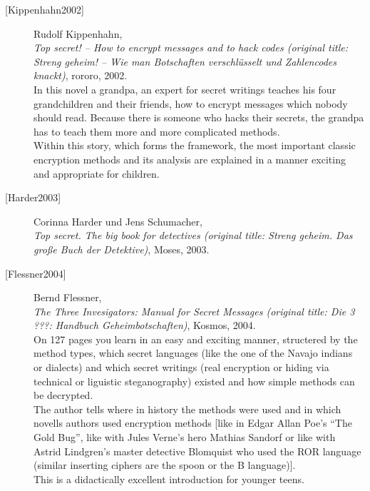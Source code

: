 \begin{description}
\item[\textrm{[Kippenhahn2002]}] 
    Rudolf Kippenhahn, \\
    {\em Top secret! -- How to encrypt messages and to hack codes (original
    title: Streng geheim! -- Wie man Botschaften verschl\"usselt und 
    Zahlencodes knackt)}, rororo, 2002. \\
    In this novel a grandpa, an expert for secret writings teaches his
    four grandchildren and their friends, how to encrypt messages which
    nobody should read. Because there is someone who hacks their secrets,
    the grandpa has to teach them more and more complicated methods. \\
    Within this story, which forms the framework, the most important classic
    encryption methods and its analysis are explained in a manner exciting
    and appropriate for children.\\


\item[\textrm{[Harder2003]}] 
    Corinna Harder und Jens Schumacher, \\
    {\em Top secret. The big book for detectives (original title: 
     Streng geheim. Das gro\ss e Buch der Detektive)}, Moses, 2003. \\


\item[\textrm{[Flessner2004]}] 
    Bernd Flessner, \\
    {\em The Three Invesigators: Manual for Secret Messages (original
    title: Die 3 ???: Handbuch Geheimbotschaften)},
    Kosmos, 2004. \\
    On 127 pages you learn in an easy and exciting manner, structered by
    the method types, which secret languages (like the one of the Navajo
    indians or dialects) and which secret writings (real encryption or
    hiding via technical or liguistic steganography) existed and how simple
    methods can be decrypted.\\
    The author tells where in history the methods were used and in which
    novells authors used encryption methods [like in Edgar Allan Poe's
    ``The Gold Bug'', like with Jules Verne's hero Mathias Sandorf or like
    with Astrid Lindgren's master detective Blomquist who used the ROR language
    (similar inserting ciphers are the spoon or the B language)].\\
    This is a didactically excellent introduction for younger teens.\\


\end{description}

